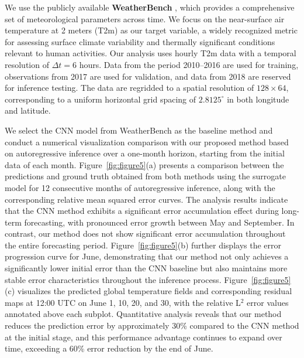 \documentclass[preprint,numbers,sort&compress]{elsarticle}
\begin{document}
			We use the publicly available \textbf{WeatherBench} \cite{rasp2020weatherbench}, which provides a comprehensive set of meteorological parameters across time. We focus on the near-surface air temperature at 2 meters (T2m) as our target variable, a widely recognized metric for assessing surface climate variability and thermally significant conditions relevant to human activities. Our analysis uses hourly T2m data with a temporal resolution of $\Delta t = 6$ hours. Data from the period 2010–2016 are used for training, observations from 2017 are used for validation, and data from 2018 are reserved for inference testing. The data are regridded to a spatial resolution of $128 \times 64$, corresponding to a uniform horizontal grid spacing of $2.8125^\circ$ in both longitude and latitude.
			
			
			
			We select the CNN model from WeatherBench \cite{rasp2020weatherbench} as the baseline method and conduct a numerical visualization comparison with our proposed method based on autoregressive inference over a one-month horizon, starting from the initial data of each month. Figure~\ref{fig:figure5}(a) presents a comparison between the predictions and ground truth obtained from both methods using the surrogate model for 12 consecutive months of autoregressive inference, along with the corresponding relative mean squared error curves. The analysis results indicate that the CNN method exhibits a significant error accumulation effect during long-term forecasting, with pronounced error growth between May and September. In contrast, our method does not show significant error accumulation throughout the entire forecasting period. Figure~\ref{fig:figure5}(b) further displays the error progression curve for June, demonstrating that our method not only achieves a significantly lower initial error than the CNN baseline but also maintains more stable error characteristics throughout the inference process. Figure~\ref{fig:figure5}(c) visualizes the predicted global temperature fields and corresponding residual maps at 12:00 UTC on June 1, 10, 20, and 30, with the relative L$^2$ error values annotated above each subplot. Quantitative analysis reveals that our method reduces the prediction error by approximately 30\% compared to the CNN method at the initial stage, and this performance advantage continues to expand over time, exceeding a 60\% error reduction by the end of June.
			
			
			
			
			
\end{document}
